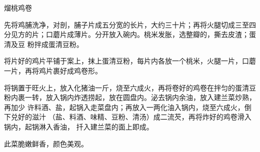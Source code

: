 %
%
%
%
%
%
%
\begin{recipe}{熘桃鸡卷}

\ingredients


\preparation

\step 先将鸡脯洗净，对剖，脯子片成五分宽的长片，大约三十片；再将火腿切成三至四
分见方的片；口蘑片成薄片。分开放入碗内。桃米发胀，选整瓣的，撕去皮渣；蛋清及豆
粉拌成蛋清豆粉。

\step 将片好的鸡片平铺于案上，抹上蛋清豆粉，每片内各放一个桃米，火腿一片，口蘑
一片，再将鸡片裹好成鸡卷形。

\step 将锅置于旺火上，放入化猪油一斤，烧至六成火，再将卷好的鸡卷在拌匀的蛋清豆
粉内裹一转，放入锅内炸透捞起，放在圆盘内。泌去锅内余油，放入建兰菜炒熟，再加少
许料酒、盐，起锅入走菜盘内；再放入一两化油入锅内，烧至六成火，倒下兑好的滋汁
（盐、料酒、味精、豆粉、清汤）成二流芡，再将炸好的鸡卷滑入锅内，起锅淋入香油，
扦入建兰菜的面上即成。

\features

此菜脆嫩鲜香，颜色美观。

\end{recipe}

